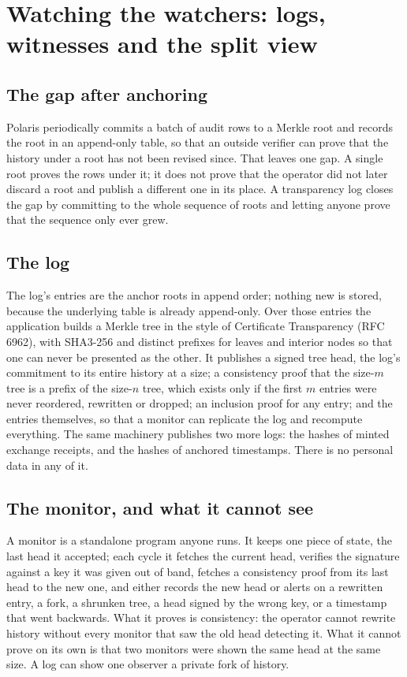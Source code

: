 \section{Watching the watchers: logs, witnesses and the split view}
\label{sec:transparency}

\subsection{The gap after anchoring}

Polaris periodically commits a batch of audit rows to a Merkle root and records the root in an
append-only table, so that an outside verifier can prove that the history under a root has not been
revised since. That leaves one gap. A single root proves the rows under it; it does not prove that
the operator did not later discard a root and publish a different one in its place. A transparency
log closes the gap by committing to the whole sequence of roots and letting anyone prove that the
sequence only ever grew. \sImpl

\subsection{The log}

The log's entries are the anchor roots in append order; nothing new is stored, because the
underlying table is already append-only. Over those entries the application builds a Merkle tree in
the style of Certificate Transparency (RFC 6962), with SHA3-256 and distinct prefixes for leaves and
interior nodes so that one can never be presented as the other. It publishes a signed tree head,
the log's commitment to its entire history at a size; a consistency proof that the size-$m$ tree is
a prefix of the size-$n$ tree, which exists only if the first $m$ entries were never reordered,
rewritten or dropped; an inclusion proof for any entry; and the entries themselves, so that a
monitor can replicate the log and recompute everything. The same machinery publishes two more logs:
the hashes of minted exchange receipts, and the hashes of anchored timestamps. There is no personal
data in any of it. \sImpl

\subsection{The monitor, and what it cannot see}

A monitor is a standalone program anyone runs. It keeps one piece of state, the last head it
accepted; each cycle it fetches the current head, verifies the signature against a key it was given
out of band, fetches a consistency proof from its last head to the new one, and either records the
new head or alerts on a rewritten entry, a fork, a shrunken tree, a head signed by the wrong key, or
a timestamp that went backwards. What it proves is consistency: the operator cannot rewrite history
without every monitor that saw the old head detecting it. What it cannot prove on its own is that
two monitors were shown the same head at the same size. A log can show one observer a private fork
of history. \sImpl

